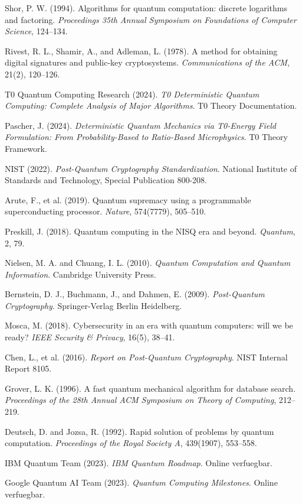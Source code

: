 \documentclass[12pt,a4paper]{article}
\begin{document}
	\begin{thebibliography}{99}
		Shor, P. W. (1994). Algorithms for quantum computation: discrete logarithms and factoring. \textit{Proceedings 35th Annual Symposium on Foundations of Computer Science}, 124--134.
		
		Rivest, R. L., Shamir, A., and Adleman, L. (1978). A method for obtaining digital signatures and public-key cryptosystems. \textit{Communications of the ACM}, 21(2), 120--126.
		
		T0 Quantum Computing Research (2024). \textit{T0 Deterministic Quantum Computing: Complete Analysis of Major Algorithms}. T0 Theory Documentation.
		
		Pascher, J. (2024). \textit{Deterministic Quantum Mechanics via T0-Energy Field Formulation: From Probability-Based to Ratio-Based Microphysics}. T0 Theory Framework.
		
		NIST (2022). \textit{Post-Quantum Cryptography Standardization}. National Institute of Standards and Technology, Special Publication 800-208.
		
		Arute, F., et al. (2019). Quantum supremacy using a programmable superconducting processor. \textit{Nature}, 574(7779), 505--510.
		
		Preskill, J. (2018). Quantum computing in the NISQ era and beyond. \textit{Quantum}, 2, 79.
		
		Nielsen, M. A. and Chuang, I. L. (2010). \textit{Quantum Computation and Quantum Information}. Cambridge University Press.
		
		Bernstein, D. J., Buchmann, J., and Dahmen, E. (2009). \textit{Post-Quantum Cryptography}. Springer-Verlag Berlin Heidelberg.
		
		Mosca, M. (2018). Cybersecurity in an era with quantum computers: will we be ready? \textit{IEEE Security \& Privacy}, 16(5), 38--41.
		
		Chen, L., et al. (2016). \textit{Report on Post-Quantum Cryptography}. NIST Internal Report 8105.
		
		Grover, L. K. (1996). A fast quantum mechanical algorithm for database search. \textit{Proceedings of the 28th Annual ACM Symposium on Theory of Computing}, 212--219.
		
		Deutsch, D. and Jozsa, R. (1992). Rapid solution of problems by quantum computation. \textit{Proceedings of the Royal Society A}, 439(1907), 553--558.
		
		IBM Quantum Team (2023). \textit{IBM Quantum Roadmap}. Online verfuegbar.
		
		Google Quantum AI Team (2023). \textit{Quantum Computing Milestones}. Online verfuegbar.
	\end{thebibliography}
	
\end{document}
